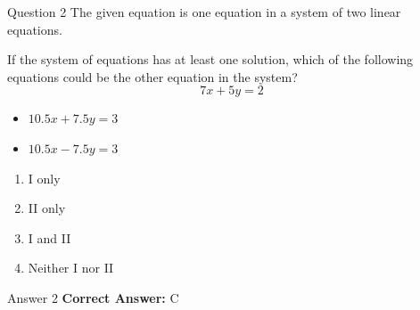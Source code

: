 \documentclass{beamer}
\begin{document}
\begin{frame}{Question 2}
\small
The given equation is one equation in a system of two linear equations.

If the system of equations has at least one solution, which of the following equations could be the other equation in the system?
\[
7x + 5y = 2
\]

\begin{itemize}
\item[I] \(10.5x + 7.5y = 3\)
\item[II] \(10.5x - 7.5y = 3\)
\end{itemize}
\vspace{0.35cm}
\begin{enumerate}
    \item[A.] I only
    \item[B.] II only
    \item[C.] I and II
    \item[D.] Neither I nor II
\end{enumerate}
\end{frame}
\begin{frame}{Answer 2}
\small
\textbf{Correct Answer:} C
\end{frame}
\end{document}
